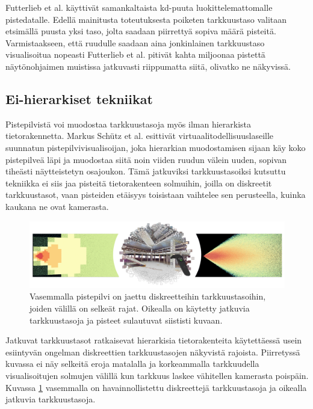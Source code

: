 Futterlieb et al. käyttivät samankaltaista kd-puuta luokittelemattomalle pistedatalle. Edellä mainitusta toteutuksesta poiketen tarkkuustaso valitaan etsimällä puusta yksi taso, jolta saadaan piirrettyä sopiva määrä pisteitä. Varmistaakseen, että ruudulle saadaan aina jonkinlainen tarkkuustaso visualisoitua nopeasti Futterlieb et al. pitivät kahta miljoonaa pistettä näytönohjaimen muistissa jatkuvasti riippumatta siitä, olivatko ne näkyvissä. \cite{smooth}

\subsection{Ei-hierarkiset tekniikat}

Pistepilvistä voi muodostaa tarkkuustasoja myös ilman hierarkista tietorakennetta. Markus Schütz et al. \cite{clod} esittivät virtuaalitodellisuuslaseille suunnatun pistepilvivisualisoijan, joka hierarkian muodostamisen sijaan käy koko pistepilveä läpi ja muodostaa siitä noin viiden ruudun välein uuden, sopivan tiheästi näytteistetyn osajoukon. Tämä jatkuviksi tarkkuustasoiksi  kutsuttu tekniikka ei siis jaa pisteitä tietorakenteen solmuihin, joilla on diskreetit tarkkuustasot, vaan pisteiden etäisyys toisistaan vaihtelee sen perusteella, kuinka kaukana ne ovat kamerasta. \cite{clod}

\begin{figure}
    \centering
    \includegraphics[width=\textwidth]{img/clod.png}
    \caption{Vasemmalla pistepilvi on jaettu diskreetteihin tarkkuustasoihin, joiden välillä on selkeät rajat. Oikealla on käytetty jatkuvia tarkkuustasoja ja pisteet sulautuvat siististi kuvaan. \cite{clod}}
    \label{img:clod}
\end{figure}

Jatkuvat tarkkuustasot ratkaisevat hierarkisia tietorakenteita käytettäessä usein esiintyvän ongelman diskreettien tarkkuustasojen näkyvistä rajoista. Piirretyssä kuvassa ei näy selkeitä eroja matalalla ja korkeammalla tarkkuudella visualisoitujen solmujen välillä kun tarkkuus laskee vähitellen kamerasta poispäin. Kuvassa \ref{img:clod} vasemmalla on havainnollistettu diskreettejä tarkkuustasoja ja oikealla jatkuvia tarkkuustasoja.

